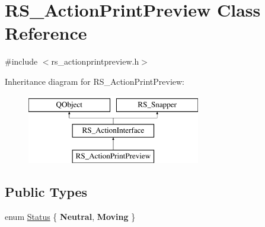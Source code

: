 \hypertarget{classRS__ActionPrintPreview}{\section{R\-S\-\_\-\-Action\-Print\-Preview Class Reference}
\label{classRS__ActionPrintPreview}
}


{\ttfamily \#include $<$rs\-\_\-actionprintpreview.\-h$>$}

Inheritance diagram for R\-S\-\_\-\-Action\-Print\-Preview\-:\begin{figure}[H]
\begin{center}
\leavevmode
\includegraphics[height=3.000000cm]{classRS__ActionPrintPreview}
\end{center}
\end{figure}
\subsection*{Public Types}
\begin{DoxyCompactItemize}
\item 
enum \hyperlink{classRS__ActionPrintPreview_a2dc680b88163ddd587f0a95dfaef0c47}{Status} \{ {\bfseries Neutral}, 
{\bfseries Moving}
 \}
\end{DoxyCompactItemize}
